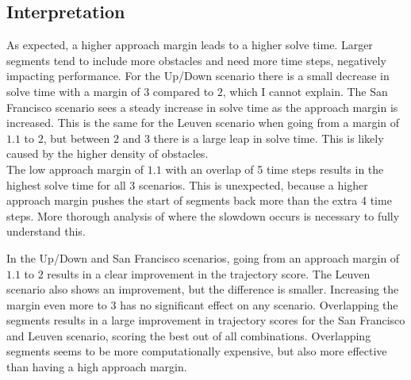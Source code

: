 \subsection{Interpretation}
As expected, a higher approach margin leads to a higher solve time. Larger segments tend to include more obstacles and need more time steps, negatively impacting performance. For the Up/Down scenario there is a small decrease in solve time with a margin of $3$ compared to $2$, which I cannot explain. The San Francisco scenario sees a steady increase in solve time as the approach margin is increased. This is the same for the Leuven scenario when going from a margin of $1.1$ to $2$, but between $2$ and $3$ there is a large leap in solve time. This is likely caused by the higher density of obstacles. \\
The low approach margin of $1.1$ with an overlap of 5 time steps results in the highest solve time for all 3 scenarios. This is unexpected, because a higher approach margin pushes the start of segments back more than the extra 4 time steps. More thorough analysis of where the slowdown occurs is necessary to fully understand this.
\par
In the Up/Down and San Francisco scenarios, going from an approach margin of $1.1$ to $2$ results in a clear improvement in the trajectory score. The Leuven scenario also shows an improvement, but the difference is smaller. Increasing the margin even more to $3$ has no significant effect on any scenario. Overlapping the segments results in a large improvement in trajectory scores for the San Francisco and Leuven scenario, scoring the best out of all combinations. Overlapping segments seems to be more computationally expensive, but also more effective than having a high approach margin. 

